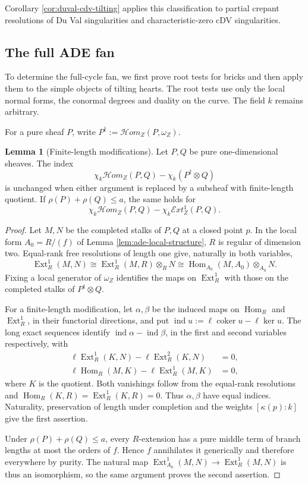 \documentclass[a4paper,reqno]{amsart}
\DeclareMathOperator{\Hom}{Hom}
\DeclareMathOperator{\Ext}{Ext}
\theoremstyle{definition}
\newtheorem{Lem}[Thm]{Lemma}
\begin{document}
Corollary \ref{cor:duval-cdv-tilting} applies this classification to partial crepant resolutions of Du Val singularities and characteristic-zero cDV singularities.

\subsection{The full ADE fan}\label{sec:full-ade-fan}

To determine the full-cycle fan, we first prove root tests for bricks and then apply them to the simple objects of tilting hearts. The root tests use only the local normal forms, the conormal degrees and duality on the curve. The field $k$ remains arbitrary.

For a pure sheaf $P$, write $P^\dagger:=\mathcal Hom_Z(P,\omega_Z)$.

\begin{Lem}[Finite-length modifications]\label{lem:ade-finite-length-invariance}
Let $P,Q$ be pure one-dimensional sheaves. The index
\[
\chi_k\mathcal Hom_Z(P,Q)-\chi_k(P^\dagger\otimes Q)
\]
is unchanged when either argument is replaced by a subsheaf with finite-length quotient. If $\rho(P)+\rho(Q)\le a$, the same holds for
\[
\chi_k\mathcal Hom_Z(P,Q)-\chi_k\mathcal Ext_Z^1(P,Q).
\]
\end{Lem}
\begin{proof}
Let $M,N$ be the completed stalks of $P,Q$ at a closed point $p$. In the local form $A_0=R/(f)$ of Lemma \ref{lem:ade-local-structure}, $R$ is regular of dimension two. Equal-rank free resolutions of length one \cite[Tag 00O7]{stacks-project} give, naturally in both variables,
\[
\Ext_R^1(M,N)
\cong\Ext_R^1(M,R)\otimes_RN
\cong\Hom_{A_0}(M,A_0)\otimes_{A_0}N.
\]
Fixing a local generator of $\omega_Z$ identifies the maps on $\Ext_R^1$ with those on the completed stalks of $P^\dagger\otimes Q$.

For a finite-length modification, let $\alpha,\beta$ be the induced maps on $\Hom_R$ and $\Ext_R^1$, in their functorial directions, and put $\operatorname{ind}u:=\ell\operatorname{coker}u-\ell\ker u$. The long exact sequences identify $\operatorname{ind}\alpha-\operatorname{ind}\beta$, in the first and second variables respectively, with
\[
\begin{aligned}
\ell\Ext_R^1(K,N)-\ell\Ext_R^2(K,N)&=0,\\
\ell\Hom_R(M,K)-\ell\Ext_R^1(M,K)&=0,
\end{aligned}
\]
where $K$ is the quotient. Both vanishings follow from the equal-rank resolutions and $\Hom_R(K,R)=\Ext_R^1(K,R)=0$. Thus $\alpha,\beta$ have equal indices. Naturality, preservation of length under completion and the weights $[\kappa(p):k]$ give the first assertion.

Under $\rho(P)+\rho(Q)\le a$, every $R$-extension has a pure middle term of branch lengths at most the orders of $f$. Hence $f$ annihilates it generically and therefore everywhere by purity. The natural map $\Ext_{A_0}^1(M,N)\to\Ext_R^1(M,N)$ is thus an isomorphism, so the same argument proves the second assertion.
\end{proof}
\end{document}

